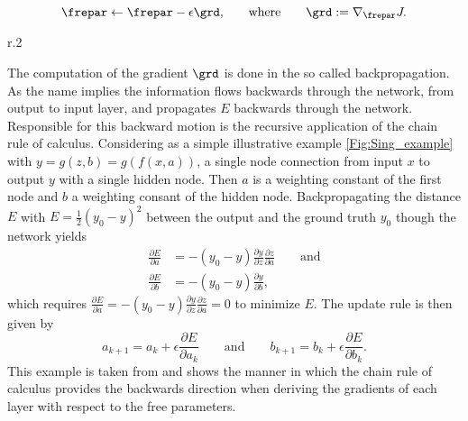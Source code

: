 \begin{equation}
	\frepar \leftarrow \frepar - \epsilon\grd\mathrm{,} \qquad\mathrm{where}\qquad \grd:= \nabla_{\frepar}J\mathrm{.}
\end{equation}
\begin{wrapfigure}{r}{.2\textwidth}
	\centering
	\vspace{-10pt}
	
	\vspace{-5pt}
	\caption{\footnotesize A single node network with one hidden node between input and output node.}
	\label{Fig:Sing_example}
\end{wrapfigure}
The computation of the gradient \(\grd\) is done in the so called backpropagation. As the name implies the information flows backwards through the network, from output to input layer, and propagates \(E\) backwards through the network. Responsible for this backward motion is the recursive application of the chain rule of calculus. Considering as a simple illustrative example \cref{Fig:Sing_example} with \(y=g(z,b)=g(f(x,a))\), a single node connection from input \(x\) to output \(y\) with a single hidden node. Then \(a\) is a weighting constant of the first node and \(b\) a weighting consant of the hidden node. Backpropagating the distance \(E\) with \(E = \frac{1}{2}(y_0 -y)^2\) between the output and the ground truth \(y_0\) though the network yields
\begin{align}
	\frac{\partial E}{\partial a} &= -(y_0 - y)\frac{\partial y}{\partial z}\frac{\partial z}{\partial a}\qquad \mathrm{and}\\
	\frac{\partial E}{\partial b} &= -(y_0 - y)\frac{\partial y}{\partial b}\mathrm{,}
\end{align}
which requires \(\frac{\partial E}{\partial a} = -(y_0 - y)\frac{\partial y}{\partial z}\frac{\partial z}{\partial a} = 0\) to minimize \(E\). The update rule is then given by
\begin{equation}
	a_{k+1} = a_k + \epsilon \frac{\partial E}{\partial a_k} \qquad\mathrm{and}\qquad
	b_{k+1} = b_k + \epsilon \frac{\partial E}{\partial b_k}\mathrm{.}
\end{equation}
This example is taken from \cite{Kutz} and shows the manner in which the chain rule of calculus provides the backwards direction when deriving the gradients of each layer with respect to the free parameters.\\

